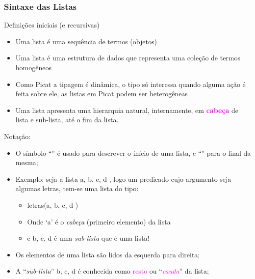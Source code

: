 \begin{frame}[fragile, allowframebreaks=0.9]
 \frametitle{Sintaxe das Listas}


\begin{block}{Definições iniciais (e recursivas)}
\begin{itemize}


\item Uma lista é uma sequência de termos (objetos)

\pause
\item Uma lista é uma estrutura de dados que representa
uma coleção de termos homogêneos

\item Como Picat a tipagem é dinâmica, o tipo só interessa quando
alguma ação é feita sobre ele, as listas em Picat podem
ser heterogêneas

\item Uma lista  apresenta uma hierarquia natural, internamente,
em \textcolor{magenta}{\textbf{cabeça}} de lista e sub-lista, até o fim da lista.

\end{itemize}
\end{block}

\framebreak
\begin{block}{Notação:}
\begin{itemize}
   \item O símbolo ``\lbrack'' é usado para descrever o início de uma lista,
e ``\rbrack'' para o final da mesma;

   \item Exemplo: seja a lista \lbrack a, b, c, d \rbrack,  logo um predicado cujo
argumento seja algumas letras,  tem-se uma lista do tipo:\\
  \begin{itemize}
  \item letras(\lbrack  a, b, c, d \rbrack )
 \item Onde `a' é  o   \textit{cabeça} (primeiro elemento) da lista
 \item e \lbrack b, c, d \rbrack é uma \textit{sub-lista} que é uma lista!
  \end{itemize}

\item Os elementos de uma lista são lidos da esquerda para direita;

\item  A ``{\em sub-lista}'' \lbrack b,  c, d \rbrack é conhecida como  \textcolor{magenta}{resto} ou
\/ ``\textcolor{magenta}{{\em cauda}}'' da lista;
        

\end{itemize}
\end{block}
\end{frame}
